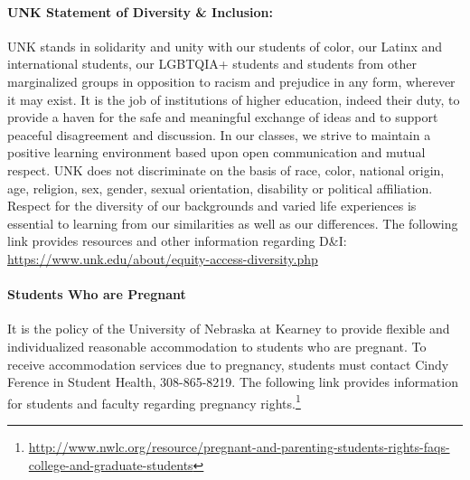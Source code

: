 \documentclass[12pt]{article}
\newcounter{ex}\setcounter{ex}{0}
\begin{document}
\paragraph{UNK Statement of Diversity \& Inclusion:} UNK stands in solidarity and unity with our students of color, our Latinx and international students, our LGBTQIA+ students and students from other marginalized groups in opposition to racism and prejudice in any form, wherever it may exist. It is the job of institutions of higher education, indeed their duty, to provide a haven for the safe and meaningful exchange of ideas and to support peaceful disagreement and discussion. In our classes, we strive to maintain a positive learning environment based upon open communication and mutual respect. UNK does not discriminate on the basis of race, color, national origin, age, religion, sex, gender, sexual orientation, disability or political affiliation. Respect for the diversity of our backgrounds and varied 
life experiences is essential to learning from our similarities as well as our differences. The following link provides resources and other information regarding D\&I: 
\url{https://www.unk.edu/about/equity-access-diversity.php}

\paragraph{Students Who are Pregnant} It is the policy of the University of Nebraska at Kearney to provide flexible and individualized reasonable accommodation to students who are pregnant. To receive accommodation services due to pregnancy, students must contact Cindy Ference in Student Health, 308-865-8219. The following link provides information for students and faculty regarding pregnancy rights.\footnote{\small  \url{http://www.nwlc.org/resource/pregnant-and-parenting-students-rights-faqs-college-and-graduate-students}}
\end{document}
